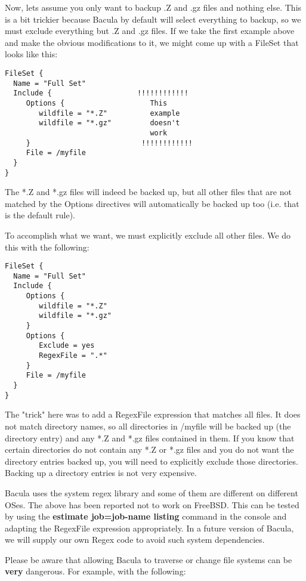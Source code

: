 Now, lets assume you only want to backup .Z and .gz files and nothing 
else. This is a bit trickier because Bacula by default will select 
everything to backup, so we must exclude everything but .Z and .gz files.
If we take the first example above and make the obvious modifications
to it, we might come up with a FileSet that looks like this:

\footnotesize 
\begin{verbatim}
FileSet {
  Name = "Full Set"
  Include {                    !!!!!!!!!!!!
     Options {                    This
        wildfile = "*.Z"          example
        wildfile = "*.gz"         doesn't
                                  work
     }                          !!!!!!!!!!!!
     File = /myfile
  }
}
\end{verbatim}
\normalsize

The *.Z and *.gz files will indeed be backed up, but all other files
that are not matched by the Options directives will automatically
be backed up too (i.e. that is the default rule).

To accomplish what we want, we must explicitly exclude all other files.
We do this with the following:

\footnotesize
\begin{verbatim}
FileSet {
  Name = "Full Set"
  Include {
     Options {
        wildfile = "*.Z"
        wildfile = "*.gz"
     }
     Options {
        Exclude = yes
        RegexFile = ".*"
     }
     File = /myfile
  }
}
\end{verbatim}
\normalsize

The "trick" here was to add a RegexFile expression that matches
all files. It does not match directory names, so all directories in
/myfile will be backed up (the directory entry) and any *.Z and *.gz
files contained in them. If you know that certain directories do
not contain any *.Z or *.gz files and you do not want the directory
entries backed up, you will need to explicitly exclude those directories.
Backing up a directory entries is not very expensive.

Bacula uses the system regex library and some of them are
different on different OSes. The above has been reported not to work
on FreeBSD. This can be tested by using the {\bf estimate job=job-name
listing} command in the console and adapting the RegexFile expression
appropriately. In a future version of Bacula, we will supply our own
Regex code to avoid such system dependencies.

Please be aware that allowing Bacula to traverse or change file systems can be
{\bf very} dangerous. For example, with the following: 

